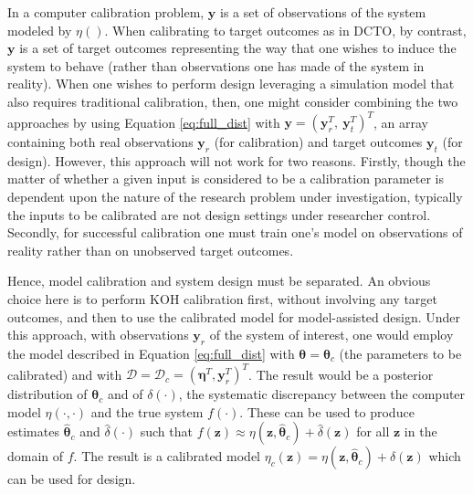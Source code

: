 \documentclass[10pt]{asme2ej}
\begin{document}
%
In a computer calibration problem, $\mathbf y$ is a set of observations of the system modeled by $\eta()$.
%
When calibrating to target outcomes as in DCTO, by contrast, $\mathbf y$ is a set of target outcomes representing the way that one wishes to induce the system to behave (rather than observations one has made of the system in reality).
%
When one wishes to perform design leveraging a simulation model that also requires traditional calibration, then, one might consider combining the two approaches by using Equation \eqref{eq:full_dist} with $\mathbf y= (\mathbf y_r^T,\ \mathbf y_t^T)^T$, an array containing both real observations $\mathbf y_r$ (for calibration) and target outcomes $\mathbf y_t$ (for design).
%
However, this approach will not work for two reasons. Firstly, though the matter of whether a given input is considered to be a calibration parameter is dependent upon the nature of the research problem under investigation, typically the inputs to be calibrated are not design settings under researcher control. Secondly, for successful calibration one must train one's model on observations of reality rather than on unobserved target outcomes.
%

%
Hence, model calibration and system design must be separated.
%
An obvious choice here is to perform KOH calibration first, without involving any target outcomes, and then to use the calibrated model for model-assisted design.
%
Under this approach, with observations $
\mathbf y_r$ of the system of interest, one would employ the model described in Equation \eqref{eq:full_dist} with $\boldsymbol \theta = \boldsymbol \theta_c$ (the parameters to be calibrated) and with $\mathcal D = \mathcal D_c = (\boldsymbol\eta^T, \mathbf y_r ^T)^T$.
%
The result would be a posterior distribution of $\boldsymbol \theta_c$ and of $\delta(\cdot)$, the systematic discrepancy between the computer model $\eta(\cdot,\cdot)$ and the true system $f(\cdot)$.
%
These can be used to produce estimates $\widehat{\boldsymbol\theta}_c$ and $\widehat\delta(\cdot)$ such that $f(\mathbf z)\approx\eta(\mathbf z,\widehat{\boldsymbol\theta}_c)+\widehat\delta(\mathbf z)$ for all $\mathbf z$ in the domain of $f$.
%
The result is a calibrated model $\eta_c(\mathbf z)=\eta(\mathbf z,\widehat{\boldsymbol\theta}_c)+\widehat\delta(\mathbf z)$ which can be used for design.
%
\end{document}
